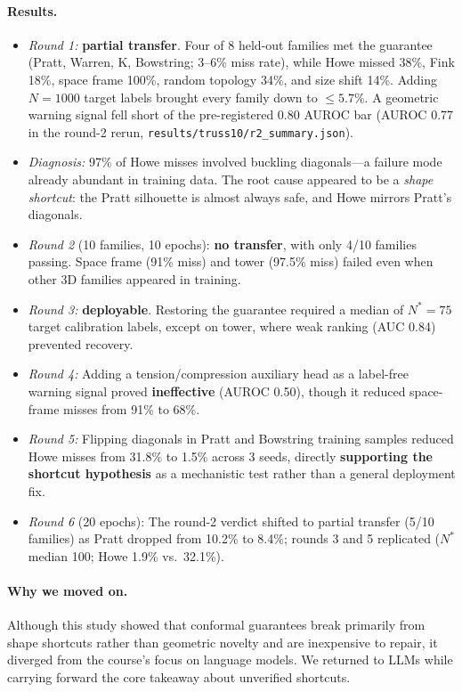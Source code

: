 \documentclass{article}
\begin{document}
\paragraph{Results.}
\begin{itemize}\itemsep0pt
\item \emph{Round 1:} \textbf{partial transfer}. Four of 8 held-out families met the guarantee (Pratt, Warren, K, Bowstring; 3--6\% miss rate), while Howe missed 38\%, Fink 18\%, space frame 100\%, random topology 34\%, and size shift 14\%. Adding $N{=}1000$ target labels brought every family down to $\leq 5.7\%$. A geometric warning signal fell short of the pre-registered 0.80 AUROC bar (AUROC 0.77 in the round-2 rerun, \texttt{results/truss10/r2\_summary.json}).
\item \emph{Diagnosis:} 97\% of Howe misses involved buckling diagonals---a failure mode already abundant in training data. The root cause appeared to be a \emph{shape shortcut}: the Pratt silhouette is almost always safe, and Howe mirrors Pratt's diagonals.
\item \emph{Round 2} (10 families, 10 epochs): \textbf{no transfer}, with only 4/10 families passing. Space frame (91\% miss) and tower (97.5\% miss) failed even when other 3D families appeared in training.
\item \emph{Round 3:} \textbf{deployable}. Restoring the guarantee required a median of $N^\ast{=}75$ target calibration labels, except on tower, where weak ranking (AUC 0.84) prevented recovery.
\item \emph{Round 4:} Adding a tension/compression auxiliary head as a label-free warning signal proved \textbf{ineffective} (AUROC 0.50), though it reduced space-frame misses from 91\% to 68\%.
\item \emph{Round 5:} Flipping diagonals in Pratt and Bowstring training samples reduced Howe misses from 31.8\% to 1.5\% across 3 seeds, directly \textbf{supporting the shortcut hypothesis} as a mechanistic test rather than a general deployment fix.
\item \emph{Round 6} (20 epochs): The round-2 verdict shifted to partial transfer (5/10 families) as Pratt dropped from 10.2\% to 8.4\%; rounds 3 and 5 replicated ($N^\ast$ median 100; Howe 1.9\% vs.\ 32.1\%).
\end{itemize}

\paragraph{Why we moved on.} Although this study showed that conformal guarantees break primarily from shape shortcuts rather than geometric novelty and are inexpensive to repair, it diverged from the course's focus on language models. We returned to LLMs while carrying forward the core takeaway about unverified shortcuts.
\end{document}
